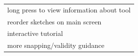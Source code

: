 \begin{longtable}[c]{@{}l@{}}
\begin{minipage}[t]{0.82\columnwidth}
long press to view information about tool
\strut\end{minipage}\tabularnewline
\begin{minipage}[t]{0.82\columnwidth}\raggedright\strut
reorder sketches on main screen
\strut\end{minipage}\tabularnewline
\begin{minipage}[t]{0.82\columnwidth}\raggedright\strut
interactive tutorial
\strut\end{minipage}\tabularnewline
\begin{minipage}[t]{0.82\columnwidth}\raggedright\strut
more snapping/validity guidance
\strut\end{minipage}\tabularnewline
\bottomrule
\end{longtable}
